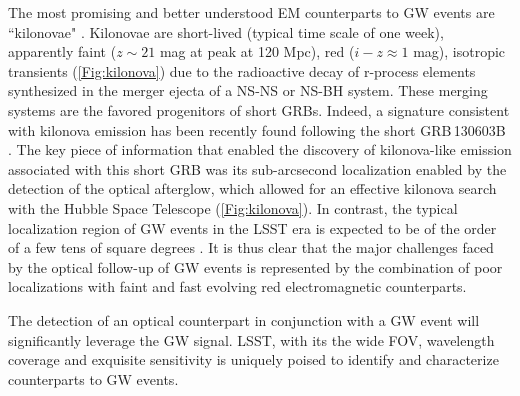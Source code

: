 The most promising and better understood EM counterparts to GW events
are ``kilonovae" \citep{Li98,Metzger10,Metzger12,Kasen13,Barnes13}.
Kilonovae are short-lived (typical time scale of one week), apparently
faint ($z\sim21$ mag at peak at 120 Mpc), red ($i-z\approx1$ mag),
isotropic transients (\autoref{Fig:kilonova}) due to the radioactive
decay of r-process elements synthesized in the merger ejecta of a NS-NS
or NS-BH system. These merging systems are the favored progenitors of
short GRBs. Indeed, a signature consistent with kilonova emission has been
recently found following the short GRB\,130603B
\citep{Berger13,Tanvir13}. The key piece of information that enabled the
discovery of kilonova-like emission associated with  this short GRB was
its sub-arcsecond localization enabled by the detection of the optical
afterglow, which allowed for an effective kilonova search with the
Hubble Space Telescope (\autoref{Fig:kilonova}). In contrast, the
typical localization region of GW events in the LSST era is expected to
be of the order of a few tens of square degrees \citep{aaa+13}. It is
thus clear that the major challenges faced by the optical follow-up of
GW events is represented by the combination of poor localizations with
faint and fast evolving red electromagnetic counterparts.

The detection of an optical counterpart in conjunction with a GW event
will significantly leverage the GW signal. LSST, with its the wide FOV,
wavelength coverage and exquisite sensitivity is uniquely poised to
identify and characterize counterparts to GW events.

